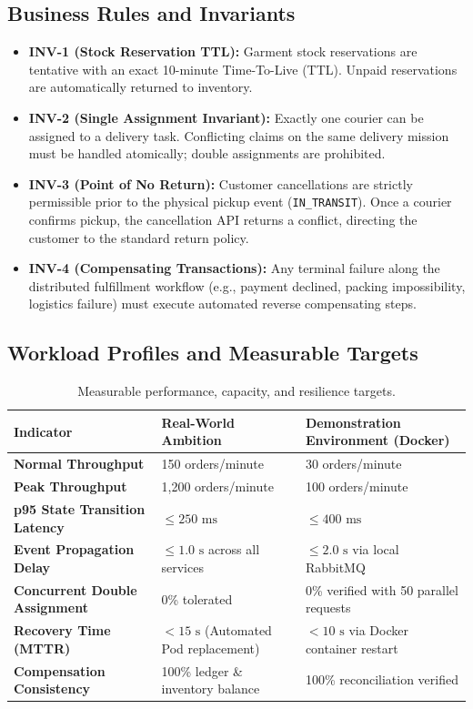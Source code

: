 \documentclass[11pt,a4paper]{article}
\begin{document}
\subsection{Business Rules and Invariants}
\begin{itemize}
    \item \textbf{INV-1 (Stock Reservation TTL):} Garment stock reservations are tentative with an exact 10-minute Time-To-Live (TTL). Unpaid reservations are automatically returned to inventory.
    \item \textbf{INV-2 (Single Assignment Invariant):} Exactly one courier can be assigned to a delivery task. Conflicting claims on the same delivery mission must be handled atomically; double assignments are prohibited.
    \item \textbf{INV-3 (Point of No Return):} Customer cancellations are strictly permissible prior to the physical pickup event (\texttt{IN\_TRANSIT}). Once a courier confirms pickup, the cancellation API returns a conflict, directing the customer to the standard return policy.
    \item \textbf{INV-4 (Compensating Transactions):} Any terminal failure along the distributed fulfillment workflow (e.g., payment declined, packing impossibility, logistics failure) must execute automated reverse compensating steps.
\end{itemize}

\subsection{Workload Profiles and Measurable Targets}

\begin{table}[h]
\centering
\small
\begin{tabularx}{\textwidth}{l X X}
\toprule
\textbf{Indicator} & \textbf{Real-World Ambition} & \textbf{Demonstration Environment (Docker)} \\
\midrule
\textbf{Normal Throughput} & 150 orders/minute & 30 orders/minute \\
\textbf{Peak Throughput} & 1,200 orders/minute & 100 orders/minute \\
\textbf{p95 State Transition Latency} & $\le 250\text{ ms}$ & $\le 400\text{ ms}$ \\
\textbf{Event Propagation Delay} & $\le 1.0\text{ s}$ across all services & $\le 2.0\text{ s}$ via local RabbitMQ \\
\textbf{Concurrent Double Assignment} & 0\% tolerated & 0\% verified with 50 parallel requests \\
\textbf{Recovery Time (MTTR)} & $< 15\text{ s}$ (Automated Pod replacement) & $< 10\text{ s}$ via Docker container restart \\
\textbf{Compensation Consistency} & 100\% ledger \& inventory balance & 100\% reconciliation verified \\
\bottomrule
\end{tabularx}
\caption{Measurable performance, capacity, and resilience targets.}
\label{tab:targets}
\end{table}
\end{document}
